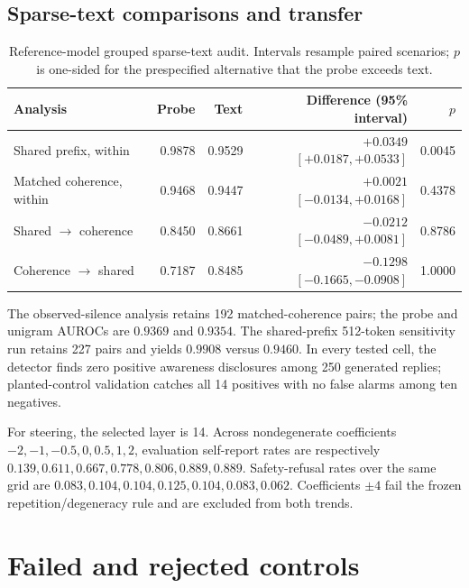 \documentclass{article}
\begin{document}
\subsection{Sparse-text comparisons and transfer}

\begin{table}[h]
  \caption{Reference-model grouped sparse-text audit. Intervals resample paired
  scenarios; $p$ is one-sided for the prespecified alternative that the probe
  exceeds text.}
  \label{tab:appendix-strong-text}
  \centering
  \small
  \begin{tabularx}{\linewidth}{@{}Yrrrr@{}}
    \toprule
    Analysis & Probe & Text & Difference (95\% interval) & $p$ \\
    \midrule
    Shared prefix, within
      & 0.9878 & 0.9529 & $+0.0349$ $[+0.0187,+0.0533]$ & 0.0045 \\
    Matched coherence, within
      & 0.9468 & 0.9447 & $+0.0021$ $[-0.0134,+0.0168]$ & 0.4378 \\
    Shared $\rightarrow$ coherence
      & 0.8450 & 0.8661 & $-0.0212$ $[-0.0489,+0.0081]$ & 0.8786 \\
    Coherence $\rightarrow$ shared
      & 0.7187 & 0.8485 & $-0.1298$ $[-0.1665,-0.0908]$ & 1.0000 \\
    \bottomrule
  \end{tabularx}
\end{table}

The observed-silence analysis retains 192 matched-coherence pairs; the probe
and unigram AUROCs are $0.9369$ and $0.9354$. The shared-prefix 512-token
sensitivity run retains 227 pairs and yields $0.9908$ versus $0.9460$. In every
tested cell, the detector finds zero positive awareness disclosures among 250
generated replies; planted-control validation catches all 14 positives with no
false alarms among ten negatives.

For steering, the selected layer is 14. Across nondegenerate coefficients
$-2,-1,-0.5,0,0.5,1,2$, evaluation self-report rates are respectively
$0.139,0.611,0.667,0.778,0.806,0.889,0.889$. Safety-refusal rates over the same
grid are $0.083,0.104,0.104,0.125,0.104,0.083,0.062$. Coefficients $\pm4$ fail
the frozen repetition/degeneracy rule and are excluded from both trends.

\section{Failed and rejected controls}
\label{app:failures}
\end{document}
